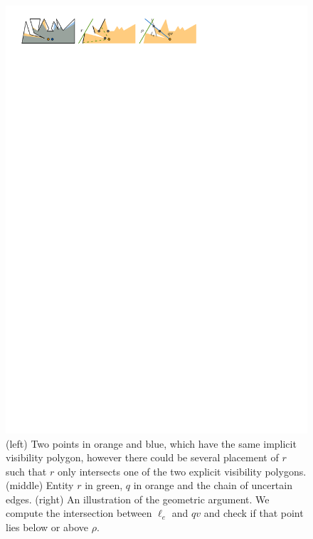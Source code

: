 \documentclass[UKenglish]{lipics-v2019}
\begin{document}
\begin{figure}[h]
    \centering
    \includegraphics[]{../pointline}
    \caption{ (left) Two points in orange and blue, which have the same implicit visibility polygon, however there could be several placement of $r$ such that $r$ only intersects one of the two explicit visibility polygons. (middle) Entity $r$ in green, $q$ in orange and the chain of uncertain edges. (right) An illustration of the geometric argument. We compute the intersection between $\ell_e$ and $qv$ and check if that point lies below or above $\rho$.}
    \label{fig:pointline}
\end{figure}
\end{document}
